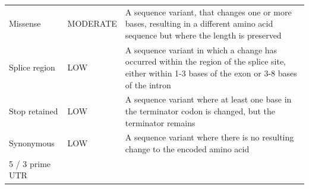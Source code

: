 \documentclass[12pt,a4paper,twoside]{ugathesis}
\theoremstyle{definition}
\theoremstyle{definition}
\theoremstyle{definition}
\theoremstyle{remark}
\begin{document}
\begin{longtable}[]{@{}lll@{}}
\begin{minipage}[t]{0.17\columnwidth}
Missense\strut
\end{minipage} & \begin{minipage}[t]{0.13\columnwidth}\raggedright\strut
MODERATE\strut
\end{minipage} & \begin{minipage}[t]{0.62\columnwidth}\raggedright\strut
A sequence variant, that changes one or more bases, resulting in a
different amino acid sequence but where the length is preserved\strut
\end{minipage}\tabularnewline
\begin{minipage}[t]{0.17\columnwidth}\raggedright\strut
Splice region\strut
\end{minipage} & \begin{minipage}[t]{0.13\columnwidth}\raggedright\strut
LOW\strut
\end{minipage} & \begin{minipage}[t]{0.62\columnwidth}\raggedright\strut
A sequence variant in which a change has occurred within the region of
the splice site, either within 1-3 bases of the exon or 3-8 bases of the
intron\strut
\end{minipage}\tabularnewline
\begin{minipage}[t]{0.17\columnwidth}\raggedright\strut
Stop retained\strut
\end{minipage} & \begin{minipage}[t]{0.13\columnwidth}\raggedright\strut
LOW\strut
\end{minipage} & \begin{minipage}[t]{0.62\columnwidth}\raggedright\strut
A sequence variant where at least one base in the terminator codon is
changed, but the terminator remains\strut
\end{minipage}\tabularnewline
\begin{minipage}[t]{0.17\columnwidth}\raggedright\strut
Synonymous\strut
\end{minipage} & \begin{minipage}[t]{0.13\columnwidth}\raggedright\strut
LOW\strut
\end{minipage} & \begin{minipage}[t]{0.62\columnwidth}\raggedright\strut
A sequence variant where there is no resulting change to the encoded
amino acid\strut
\end{minipage}\tabularnewline
\begin{minipage}[t]{0.17\columnwidth}\raggedright\strut
5 / 3 prime UTR\strut
\end{minipage} & \begin{minipage}[t]{0.13\columnwidth}\raggedright\strut

\end{minipage}
\end{longtable}
\end{document}
